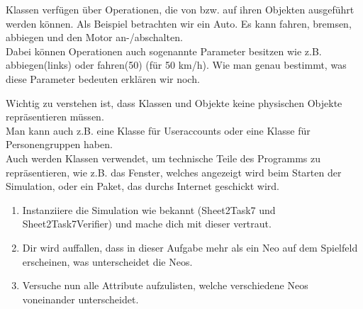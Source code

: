 \begin{Infobox}
    Klassen verfügen über Operationen, die von bzw. auf ihren Objekten ausgeführt werden können.
Als Beispiel betrachten wir ein Auto. Es kann fahren, bremsen, abbiegen und den Motor an-/abschalten.\\

Dabei können Operationen auch sogenannte Parameter besitzen wie z.B. abbiegen(links) oder fahren(50) (für 50 km/h).
Wie man genau bestimmt, was diese Parameter bedeuten erklären wir noch.
\end{Infobox}

\begin{Infobox}
Wichtig zu verstehen ist, dass Klassen und Objekte keine physischen Objekte repräsentieren müssen.\\
Man kann auch z.B. eine Klasse für Useraccounts oder eine Klasse für Personengruppen haben.\\
Auch werden Klassen verwendet, um technische Teile des Programms zu repräsentieren, wie z.B. das Fenster, welches angezeigt wird beim Starten der Simulation, oder ein Paket, das durchs Internet geschickt wird.
\end{Infobox}

\begin{enumerate}
\item Instanziiere die Simulation wie bekannt (Sheet2Task7 und Sheet2Task7Verifier) und mache dich mit dieser vertraut.
\item Dir wird auffallen, dass in dieser Aufgabe mehr als ein Neo auf dem Spielfeld erscheinen, was unterscheidet die Neos.
\item Versuche nun alle Attribute aufzulisten, welche verschiedene Neos voneinander unterscheidet.
\end{enumerate}
